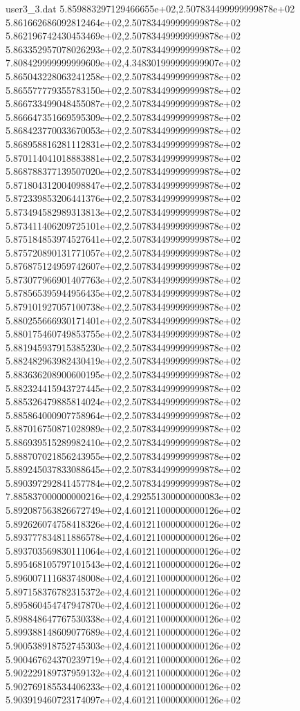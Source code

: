 \begin{filecontents}{user3_3.dat}
5.859883297129466655e+02,2.507834499999999878e+02
5.861662686092812464e+02,2.507834499999999878e+02
5.862196742430453469e+02,2.507834499999999878e+02
5.863352957078026293e+02,2.507834499999999878e+02
7.808429999999999609e+02,4.348301999999999907e+02
5.865043228063241258e+02,2.507834499999999878e+02
5.865577779355783150e+02,2.507834499999999878e+02
5.866733499048455087e+02,2.507834499999999878e+02
5.866647351669595309e+02,2.507834499999999878e+02
5.868423770033670053e+02,2.507834499999999878e+02
5.868958816281112831e+02,2.507834499999999878e+02
5.870114041018883881e+02,2.507834499999999878e+02
5.868788377139507020e+02,2.507834499999999878e+02
5.871804312004098847e+02,2.507834499999999878e+02
5.872339853206441376e+02,2.507834499999999878e+02
5.873494582989313813e+02,2.507834499999999878e+02
5.873411406209725101e+02,2.507834499999999878e+02
5.875184853974527641e+02,2.507834499999999878e+02
5.875720890131771057e+02,2.507834499999999878e+02
5.876875124959742607e+02,2.507834499999999878e+02
5.873077966901407763e+02,2.507834499999999878e+02
5.878565395944956435e+02,2.507834499999999878e+02
5.879101927057100738e+02,2.507834499999999878e+02
5.880255666930171401e+02,2.507834499999999878e+02
5.880175460749853755e+02,2.507834499999999878e+02
5.881945937915385230e+02,2.507834499999999878e+02
5.882482963982430419e+02,2.507834499999999878e+02
5.883636208900600195e+02,2.507834499999999878e+02
5.882324415943727445e+02,2.507834499999999878e+02
5.885326479885814024e+02,2.507834499999999878e+02
5.885864000907758964e+02,2.507834499999999878e+02
5.887016750871028989e+02,2.507834499999999878e+02
5.886939515289982410e+02,2.507834499999999878e+02
5.888707021856243955e+02,2.507834499999999878e+02
5.889245037833088645e+02,2.507834499999999878e+02
5.890397292841457784e+02,2.507834499999999878e+02
7.885837000000000216e+02,4.292551300000000083e+02
5.892087563826672749e+02,4.601211000000000126e+02
5.892626074758418326e+02,4.601211000000000126e+02
5.893777834811886578e+02,4.601211000000000126e+02
5.893703569830111064e+02,4.601211000000000126e+02
5.895468105797101543e+02,4.601211000000000126e+02
5.896007111683748008e+02,4.601211000000000126e+02
5.897158376782315372e+02,4.601211000000000126e+02
5.895860454747947870e+02,4.601211000000000126e+02
5.898848647767530338e+02,4.601211000000000126e+02
5.899388148609077689e+02,4.601211000000000126e+02
5.900538918752745303e+02,4.601211000000000126e+02
5.900467624370239719e+02,4.601211000000000126e+02
5.902229189737959132e+02,4.601211000000000126e+02
5.902769185534406233e+02,4.601211000000000126e+02
5.903919460723174097e+02,4.601211000000000126e+02

\end{filecontents}
